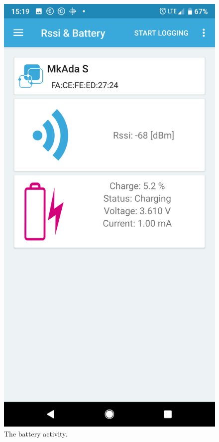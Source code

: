 \documentclass[11pt]{article}
\numberwithin{figure}{section}
\begin{document}
\begin{figure}[H] %
\centering
\includegraphics[scale=0.3]{battery.png}
\caption{The battery activity.}
\label{Figure: Battery}
\end{figure}
\end{document}
